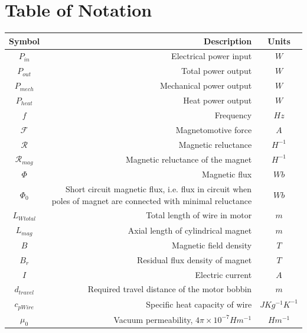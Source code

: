 \documentclass[a4paper,12pt]{article}
\begin{document}
\section*{Table of Notation}
\begin{center}
    \begin{tabular}{c | D | c}
        \hline
        \textbf{Symbol} & \textbf{Description} & \textbf{Units} \\ [0.5ex]
        \hline\hline
        $P_{in}$ & Electrical power input & $W$ \\
        \hline
        $P_{out}$ & Total power output & $W$ \\
        \hline
        $P_{mech}$ & Mechanical power output & $W$ \\
        \hline
        $P_{heat}$ & Heat power output & $W$ \\
        \hline
        $f$ & Frequency & $Hz$ \\
        \hline
        $\mathcal{F}$ & Magnetomotive force & $A$ \\
        \hline
        $\mathcal{R}$ & Magnetic reluctance & $H^{-1}$ \\
        \hline
        $\mathcal{R}_{mag}$ & Magnetic reluctance of the magnet & $H^{-1}$ \\
        \hline
        $\Phi$ & Magnetic flux & $Wb$ \\
        \hline
        $\Phi_0$ & Short circuit magnetic flux, i.e. flux in circuit when poles of magnet are connected with minimal reluctance & $Wb$ \\
        \hline
        $L_{Wtotal}$ & Total length of wire in motor & $m$ \\
        \hline
        $L_{mag}$ & Axial length of cylindrical magnet & $m$ \\
        \hline
        $B$ & Magnetic field density & $T$ \\
        \hline
        $B_{r}$ & Residual flux density of magnet & $T$ \\
        \hline
        $I$ & Electric current & $A$ \\
        \hline
        $d_{travel}$ & Required travel distance of the motor bobbin & $m$ \\
        \hline
        $c_{pWire}$ & Specific heat capacity of wire & $JKg^{-1}K^{-1}$ \\
        \hline
        $\mu_0$ & Vacuum permeability, $4\pi\times10^{-7} Hm^{-1}$ \cite{engineeringtoolboxPermeability2016} & $Hm^{-1}$ \\
        \hline

\end{tabular}
\end{center}
\end{document}
